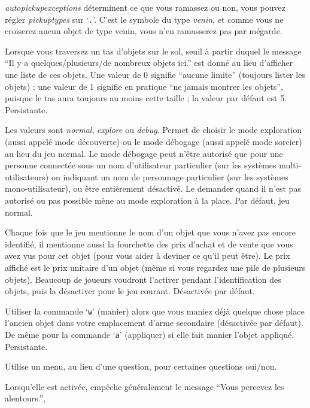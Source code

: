 \documentclass[titlepage]{article}
\begin{document}
\begin{description}[font=\mdseries\itshape]
\textit{autopickup\textunderscore exceptions} déterminent ce que vous ramassez ou non,
vous pouvez régler \textit{pickup\textunderscore types} sur `\texttt{.}'.
C'est le symbole du type \textit{venin}, et comme vous ne croiserez
aucun objet de type venin, vous n'en ramasserez pas par mégarde.
\item[pile\textunderscore limit]
Lorsque vous traversez un tas d'objets sur le sol, seuil à partir duquel
le message ``Il y a quelques/plusieurs/de nombreux objets ici.'' est donné au lieu
d'afficher une liste de ces objets. Une valeur de 0 signifie ``aucune limite''
(toujours lister les objets) ; une valeur de 1 signifie en pratique ``ne jamais montrer
les objets'', puisque le tas aura toujours au moins cette taille ;
la valeur par défaut est 5. Persistante.
\item[playmode]
Les valeurs sont \textit{normal}, \textit{explore} ou \textit{debug}.
Permet de choisir le mode exploration (aussi appelé mode découverte) ou le mode
débogage (aussi appelé mode sorcier) au lieu du jeu normal.
Le mode débogage peut n'être autorisé que pour une personne connectée sous un
nom d'utilisateur particulier (sur les systèmes multi-utilisateurs) ou indiquant un nom
de personnage particulier (sur les systèmes mono-utilisateur), ou être entièrement désactivé.
Le demander quand il n'est pas autorisé ou pas possible mène au mode exploration à la place.
Par défaut, jeu normal.
\item[price\textunderscore quotes]
Chaque fois que le jeu mentionne le nom d'un objet que vous n'avez pas encore identifié,
il mentionne aussi la fourchette des prix d'achat et de vente que vous avez vus pour cet
objet (pour vous aider à deviner ce qu'il peut être).
Le prix affiché est le prix unitaire d'un objet (même si vous regardez
une pile de plusieurs objets).
Beaucoup de joueurs voudront l'activer pendant l'identification des objets, puis
la désactiver pour le jeu courant.
Désactivée par défaut.
\item[pushweapon]
Utiliser la commande `\texttt{w}' (manier) alors que vous maniez déjà
quelque chose place l'ancien objet dans votre emplacement d'arme secondaire (désactivée par défaut).
De même pour la commande `\texttt{a}' (appliquer) si elle fait manier l'objet
appliqué. Persistante.
\item[query\textunderscore menu]
Utilise un menu, au lieu d'une question, pour certaines questions oui/non.
\item[quick\textunderscore farsight]
Lorsqu'elle est activée, empêche généralement le message ``Vous percevez les alentours.'',

\end{description}
\end{document}
